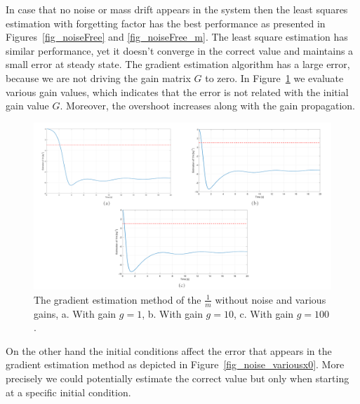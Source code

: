 \documentclass[12pt]{article}
\newenvironment{question}[2][Question]{\begin{trivlist}
\item[\hskip \labelsep {\bfseries #1}\hskip \labelsep {\bfseries #2.}]}{\end{trivlist}}
\begin{document}
\begin{question}{3} %
In case that no noise or mass drift appears in the system then the least squares estimation with forgetting factor has the best performance as presented in Figures~\ref{fig_noiseFree} and \ref{fig_noiseFree_m}. The least square estimation has similar performance, yet it doesn't converge in the correct value and maintains a small error at steady state. The gradient estimation algorithm has a large error, because we are not driving the gain matrix $G$ to zero. In Figure~\ref{fig_noise_variousG} we evaluate various gain values, which indicates that the error is not related with the initial gain value $G$. Moreover, the overshoot increases along with the gain propagation.

\begin{figure}[!h]
	\includegraphics[width=.95\columnwidth]{figures/gradient_noiseFree_variousgG.png}
	\centering
	\caption{The gradient estimation method of the $\frac{1}{m}$ without noise and various gains, a. With gain $g=1$, b. With gain $g=10$, c. With gain $g=100$.}
	\label{fig_noise_variousG}
\end{figure}

On the other hand the initial conditions affect the error that appears in the gradient estimation method as depicted in Figure~\ref{fig_noise_variousx0}. More precisely we could potentially estimate the correct value but only when starting at a specific initial condition.


\end{question}
\end{document}
